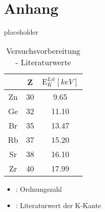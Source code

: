 \section{Anhang}
placeholder



\begin{table}
    \begin{minipage}{.5\textwidth} 
        \caption{Versuchsvorbereitung - Literaturwerte \cite{Steffen}}
        \centering
        \begin{tabular}{c c c}
            \toprule
                \mbox{} & Z & $\text{E}_K^{Lit} [\si{keV}]$  \\ %
            \midrule
                Zn & 30 & 9.65   \\
                Ge & 32 & 11.10  \\
                Br & 35 & 13.47  \\
                Rb & 37 & 15.20  \\
                Sr & 38 & 16.10  \\
                Zr & 40 & 17.99 \\
            \bottomrule    
        \end{tabular}
    \end{minipage}
\begin{minipage}{.5\textwidth}
    \begin{itemize}
    \item[]{: Ordnungszahl}
    \item[]{: Literaturwert der K-Kante}
    \end{itemize}
\end{minipage}
\end{table}